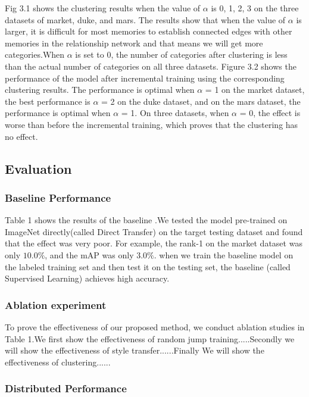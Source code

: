 \documentclass{article}
\begin{document}
Fig 3.1 shows the clustering results when the value of $\alpha$ is 0, 1, 2, 3 on the three datasets of market, duke, and mars. The results show that when the value of $\alpha$ is larger, it is difficult for most memories to establish connected edges with other memories in the relationship network and that means we will get more categories.When $\alpha$ is set to 0, the number of categories after clustering is less than the actual number of categories on all three datasets. Figure 3.2 shows the performance of the model after incremental training using the corresponding clustering results. The performance is optimal when $\alpha$ = 1 on the market dataset, the best performance is $\alpha$ = 2 on the duke dataset, and on the mars dataset, the performance is optimal when $\alpha$ = 1. On three datasets, when $\alpha$ = 0, the effect is worse than before the incremental training, which proves that the clustering has no effect.


\subsection{Evaluation}

\subsubsection{Baseline Performance}
Table 1 shows the results of the baseline .We tested the model pre-trained on ImageNet directly(called Direct Transfer) on the target testing dataset and found that the effect was very poor. For example, the rank-1 on the market dataset was only $10.0\%$, and the mAP was only $3.0\%$. when we train the baseline model on the labeled training set and then test it on the testing set,  the baseline (called Supervised Learning) achieves high accuracy.

\subsubsection{Ablation experiment}
To prove the effectiveness of our proposed method,  we conduct ablation studies in Table 1.We first show the effectiveness of random jump training.....Secondly we will show the effectiveness of style transfer......Finally We will show the effectiveness of clustering......


\subsubsection{Distributed Performance}
\end{document}
